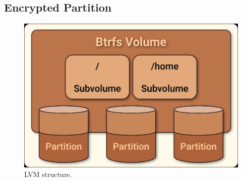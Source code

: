 \documentclass[10pt, a4paper, onecolumn, oneside, titlepage, openany]{book}
\begin{document}
\subsection{Encrypted Partition}
\begin{figure}[ht]
    \begin{center}
        \includegraphics[width=115mm]{./src/img/btrfs.png}
        \caption{LVM structure.}
        \label{fig:1}
    \end{center}
\end{figure}
\end{document}
